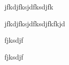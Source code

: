 \documentclass{article}
\begin{document}
    jfkdjfksjdfksdjfk

    jfkdjfksjdfksdjfkfkjd

    fjksdjf

    fjksdjf
\end{document}
